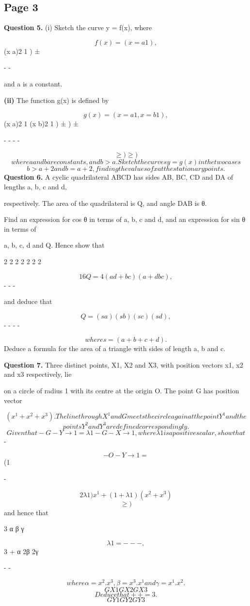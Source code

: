 \documentclass[12pt]{article}
\begin{document}
\subsection*{Page 3}
\begin{flushleft}
\sigma\par
\bigskip\textbf{Question 5.} (i) Sketch the curve y = f(x), where\par
\[f(x) = (x = a 1),\]
(x a)2 1 ) ±\par
- -\par
and a is a constant.\par
\textbf{(ii)} The function g(x) is defined by\par
\[g(x) = (x = a 1, x = b 1),\]
(x a)2 1 (x b)2 1 ) ± ) ±\par
- - - -\par
\[\geq )\geq )\]
\[where a and b are constants, and b > a. Sketch the curves y = g(x) in the two cases\]
\[b > a + 2 and b = a + 2, finding the values of x at the stationary points.\]
\bigskip\textbf{Question 6.} A cyclic quadrilateral ABCD has sides AB, BC, CD and DA of lengths a, b, c and d,\par
respectively. The area of the quadrilateral is Q, and angle DAB is θ.\par
Find an expression for cos θ in terms of a, b, c and d, and an expression for sin θ in terms of\par
a, b, c, d and Q. Hence show that\par
2 2 2 2 2 2 2\par
\[16Q = 4(ad + bc) (a + d b c ) ,\]
- - -\par
and deduce that\par
\[Q = (s a)(s b)(s c)(s d) ,\]
- - - -\par
\[where s = (a + b + c + d).\]
Deduce a formula for the area of a triangle with sides of length a, b and c.\par
\bigskip\textbf{Question 7.} Three distinct points, X1, X2 and X3, with position vectors x1, x2 and x3 respectively, lie\par
on a circle of radius 1 with its centre at the origin O. The point G has position vector\par
\[(x^1 + x^2 + x^3). The line through X^1 and G meets the circle again at the point Y^1 and the\]
\[points Y^2 and Y^3 are defined correspondingly.\]
\[Given that -G-Y\to1 = λ1-G-X\to1, where λ1 is a positive scalar, show that\]
-\par
\[-O-Y\to1 =\]
(1\par
-\par
\[2λ1)x^1 + (1 + λ1)(x^2 + x^3)\]
\[\geq )\]
and hence that\par
3 α β γ\par
\[λ1 = - - - ,\]
3 + α 2β 2γ\par
- -\par
\[where α = x^2 . x^3, β = x^3 . x^1 and γ = x^1 . x^2.\]
\[GX1 GX2 GX3\]
\[Deduce that + + = 3 .\]
\[GY1 GY2 GY3\]
\end{flushleft}
\end{document}
